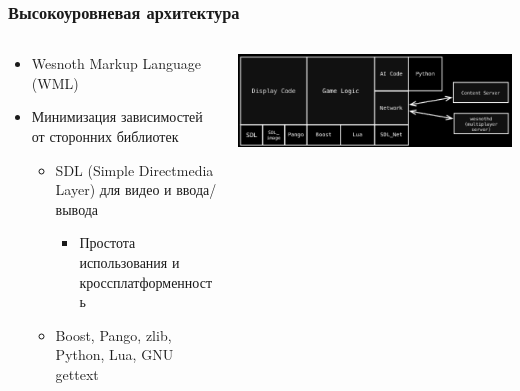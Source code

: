 \documentclass{../cscslides}
\begin{document}
    \begin{frame}
        \frametitle{Высокоуровневая архитектура}
        \begin{columns}
            \begin{column}{0.6\textwidth}
                \begin{itemize}
                    \item Wesnoth Markup Language (WML)
                    \item Минимизация зависимостей от сторонних библиотек
                    \begin{itemize}
                        \item SDL (Simple Directmedia Layer) для видео и ввода/вывода
                        \begin{itemize}
                            \item Простота использования и кроссплатформенность
                        \end{itemize}
                        \item Boost, Pango, zlib, Python, Lua, GNU gettext
                    \end{itemize}
                \end{itemize}
            \end{column}
            \begin{column}{0.4\textwidth}
                \includegraphics[width=\textwidth]{wesnothArchitectureBlack.png}
            \end{column}
        \end{columns}
    \end{frame}
\end{document}
